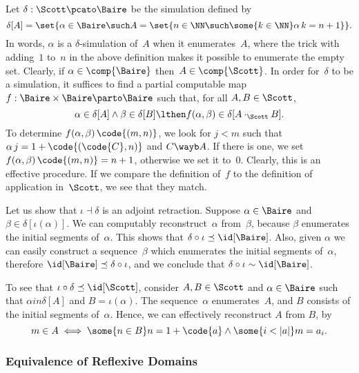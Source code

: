 Let $\delta: \Scott \pcato \Baire$ be the simulation defined by
%
\begin{equation*}
  \delta[A] =
  \set{ \alpha \in \Baire \such
        A = \set{n \in \NN \such \some{k \in \NN} \alpha\,k = n + 1}
  }.
\end{equation*}
%
In words, $\alpha$ is a $\delta$-simulation of~$A$ when it
enumerates~$A$, where the trick with adding~$1$ to~$n$ in the above definition makes it possible to enumerate the empty set. Clearly, if $\alpha \in \comp{\Baire}$
then~$A \in \comp{\Scott}$. In order for~$\delta$ to be a simulation, it suffices to find a partial computable map $f : \Baire \times \Baire \parto \Baire$ such that,
for all $A, B \in \Scott$,
% 
\begin{equation*}
  \alpha \in \delta[A] \land
  \beta \in \delta[B]
  \lthen
  f (\alpha, \beta) \in \delta[A \cdot_{\Scott} B].
\end{equation*}
% 
To determine $f (\alpha, \beta) \, \code{(m, n)}$, we look for $j < m$ such that $\alpha \, j = 1 + \code{(\code{C}, n)}$ and $C \wayb A$. If there is one, we set $f (\alpha, \beta) \, \code{(m, n)} = n + 1$, otherwise we set it to~$0$.
Clearly, this is an effective procedure. If we compare the definition of~$f$ to the definition of application in~$\Scott$, we see that they match.

Let us show that $\iota \dashv \delta$ is an adjoint retraction.
%
Suppose $\alpha \in \Baire$ and $\beta \in \delta[\iota(\alpha)]$.
%
We can computably reconstruct~$\alpha$ from~$\beta$, because $\beta$ enumerates the initial
segments of~$\alpha$. This shows that $\delta \circ \iota \preceq \id[\Baire]$. Also, given $\alpha$ we can easily
construct a sequence~$\beta$ which enumerates the initial segments of~$\alpha$, therefore
$\id[\Baire] \preceq \delta \circ \iota$, and we conclude that $\delta \circ \iota \sim \id[\Baire]$.

To see that $\iota \circ \delta \preceq \id[\Scott]$, consider $A, B \in \Scott$ and $\alpha \in \Baire$ such that $\alpha in \delta[A]$ and $B = \iota(\alpha)$. The sequence~$\alpha$ enumerates~$A$, and $B$ consists of the initial segments of~$\alpha$. Hence, we can effectively reconstruct $A$ from $B$, by
%
\begin{equation*}
  m \in A
  \iff
  \some{n \in B} n = 1 + \code{a} \land \some{i < |a|} m = a_i.
\end{equation*}


\subsubsection{Equivalence of Reflexive Domains}
\label{sec:equivalence_reflexive_domains}%

